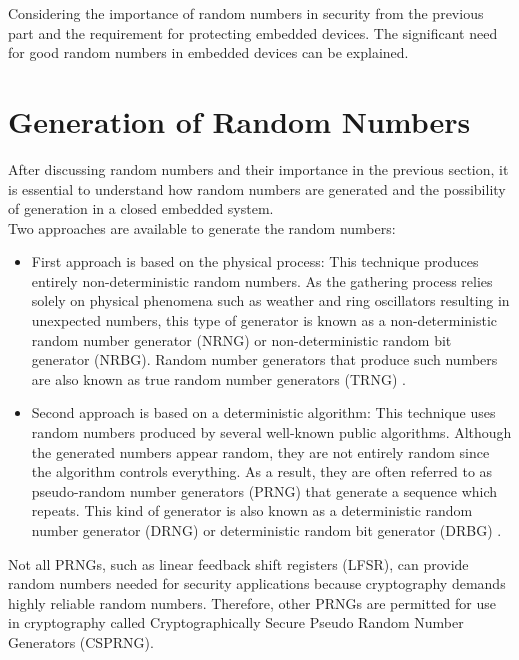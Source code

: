 Considering the importance of random numbers in security from the previous part and the requirement for protecting embedded devices. The significant need for good random numbers in embedded devices can be explained.

%
%
\section{Generation of Random Numbers}
\label{sec:intro:Generation of Random Numbers}

After discussing random numbers and their importance in the previous section, it is essential to understand how random numbers are generated and the possibility of generation in a closed embedded system.\\
Two approaches are available to generate the random numbers:

\begin{itemize}
	\item First approach is based on the physical process: This technique produces entirely non-deterministic random numbers. As the gathering process relies solely on physical phenomena such as weather and ring oscillators resulting in unexpected numbers, this type of generator is known as a non-deterministic random number generator (NRNG) or non-deterministic random bit generator (NRBG). Random number generators that produce such numbers are also known as true random number generators (TRNG) \cite{RANDOM-1998}.
	
	\item Second approach is based on a deterministic algorithm: This technique uses random numbers produced by several well-known public algorithms. Although the generated numbers appear random, they are not entirely random since the algorithm controls everything. As a result, they are often referred to as pseudo-random number generators (PRNG) that generate a sequence which repeats. This kind of generator is also known as a deterministic random number generator (DRNG) or deterministic random bit generator (DRBG) \cite{RANDOM-1998}.
\end{itemize}

Not all PRNGs, such as linear feedback shift registers (LFSR), can provide random numbers needed for security applications because cryptography demands highly reliable random numbers. Therefore, other PRNGs are permitted for use in cryptography called Cryptographically Secure Pseudo Random Number Generators (CSPRNG).

